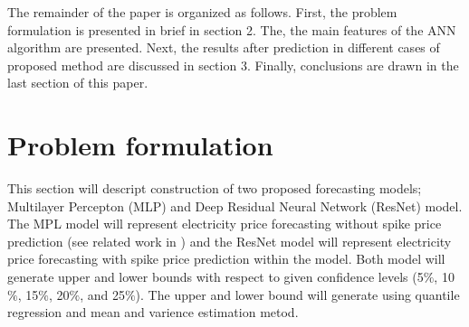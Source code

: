 \documentclass[review]{elsarticle}
\begin{document}

    The remainder of the paper is organized as follows.
    First, the problem formulation is presented in brief in section 2.
    The, the main features of the ANN algorithm are presented.
    Next, the results after prediction in different cases of proposed method  are discussed in section 3.
    Finally, conclusions are drawn in the last section of this paper.

  \section{Problem formulation}
    This section will descript construction of two proposed forecasting models; Multilayer Percepton (MLP) and Deep Residual Neural Network (ResNet) model.
    The MPL model will represent electricity price forecasting without spike price prediction (see related work in \cite{Dudek2016}) and the ResNet model will represent electricity price forecasting with spike price prediction within the model.
    Both model will generate upper and lower bounds with respect to given confidence levels (5$\%$, 10$\%$, 15$\%$, 20$\%$, and 25$\%$).
    The upper and lower bound will generate using quantile regression and mean and varience estimation metod.
\end{document}
